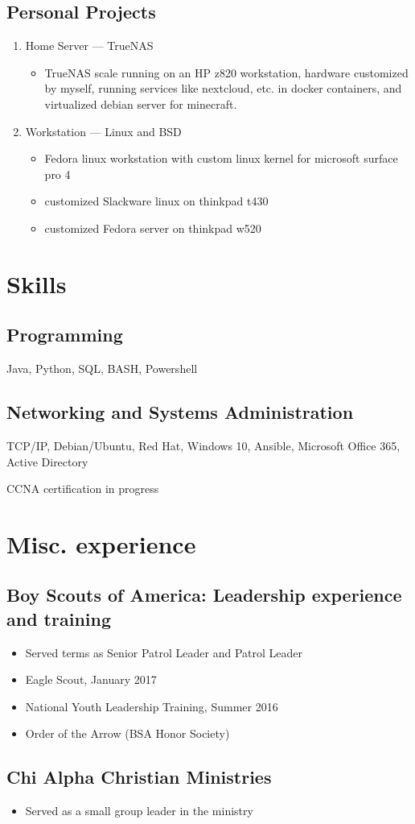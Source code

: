 \documentclass{article}
\begin{document}
\subsection{Personal Projects}
\begin{enumerate}
    \item Home Server --- TrueNAS
        \begin{itemize}
            \item TrueNAS scale running on an HP z820 workstation, hardware customized by myself,
                running services like nextcloud, etc. in docker containers, and virtualized debian
                server for minecraft.
        \end{itemize}
    \item Workstation --- Linux and BSD
        \begin{itemize}
            \item Fedora linux workstation with custom linux kernel for microsoft surface pro 4
            \item customized Slackware linux on thinkpad t430
            \item customized Fedora server on thinkpad w520
        \end{itemize}
\end{enumerate}

\section{Skills}

\subsection{Programming}

Java, Python, SQL, BASH, Powershell
\subsection{Networking and Systems Administration}

TCP/IP, Debian/Ubuntu, Red Hat, Windows 10, Ansible, Microsoft Office 365, Active Directory


CCNA certification in progress


\section{Misc. experience}
  \subsection{Boy Scouts of America: Leadership experience and training}
    \begin{itemize}
      \item Served terms as Senior Patrol Leader and Patrol Leader
      \item Eagle Scout, January 2017
      \item National Youth Leadership Training, Summer 2016
      \item Order of the Arrow (BSA Honor Society)
    \end{itemize}
  \subsection{Chi Alpha Christian Ministries}
    \begin{itemize}
      \item Served as a small group leader in the ministry
    \end{itemize}
\end{document}

